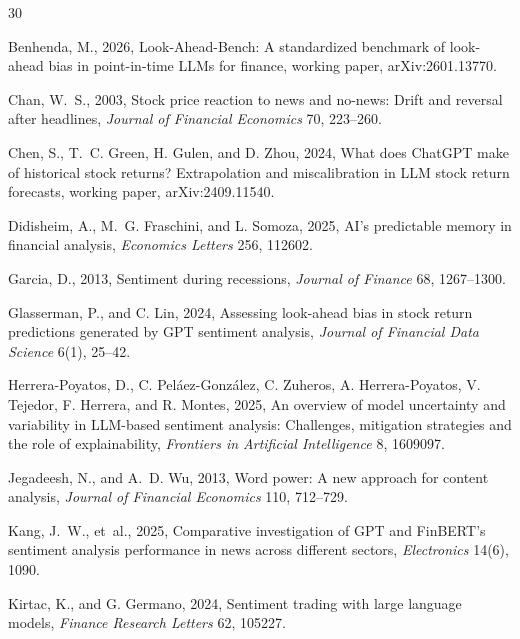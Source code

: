 \begin{thebibliography}{30}
\setlength{\bibsep}{3pt}
\small

Benhenda, M., 2026, {L}ook-{A}head-{B}ench: A standardized benchmark of look-ahead bias in point-in-time {LLM}s for finance, working paper, arXiv:2601.13770.

Chan, W.~S., 2003, Stock price reaction to news and no-news: {D}rift and reversal after headlines, \emph{Journal of Financial Economics} 70, 223--260.

Chen, S., T.~C. Green, H. Gulen, and D. Zhou, 2024, What does {ChatGPT} make of historical stock returns? {E}xtrapolation and miscalibration in {LLM} stock return forecasts, working paper, arXiv:2409.11540.

Didisheim, A., M.~G. Fraschini, and L. Somoza, 2025, {AI}'s predictable memory in financial analysis, \emph{Economics Letters} 256, 112602.

Garcia, D., 2013, Sentiment during recessions, \emph{Journal of Finance} 68, 1267--1300.

Glasserman, P., and C. Lin, 2024, Assessing look-ahead bias in stock return predictions generated by {GPT} sentiment analysis, \emph{Journal of Financial Data Science} 6(1), 25--42.

Herrera-Poyatos, D., C. Pel\'aez-Gonz\'alez, C. Zuheros, A. Herrera-Poyatos, V. Tejedor, F. Herrera, and R. Montes, 2025, An overview of model uncertainty and variability in {LLM}-based sentiment analysis: {C}hallenges, mitigation strategies and the role of explainability, \emph{Frontiers in Artificial Intelligence} 8, 1609097.

Jegadeesh, N., and A.~D. Wu, 2013, Word power: {A} new approach for content analysis, \emph{Journal of Financial Economics} 110, 712--729.

Kang, J.~W., et~al., 2025, Comparative investigation of {GPT} and {FinBERT}'s sentiment analysis performance in news across different sectors, \emph{Electronics} 14(6), 1090.

Kirtac, K., and G. Germano, 2024, Sentiment trading with large language models, \emph{Finance Research Letters} 62, 105227.


\end{thebibliography}
